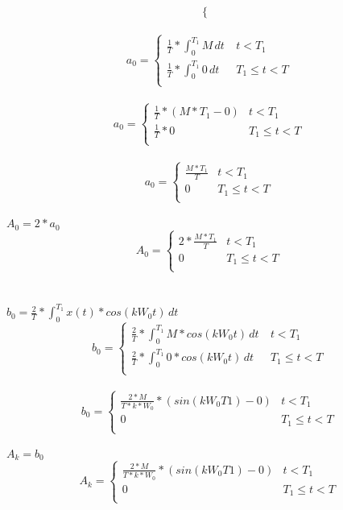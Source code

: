 \documentclass[10pt,a4paper, margin=1in]{article}
\begin{document}
\begin{enumerate}
\[\begin{cases}
   \end{cases}
\]
\\
\[a_0 = \begin{cases}
	  \frac{1}{T} * \int_{0}^{T_1} M \,dt\  & t < T_1 \\ 
	  \frac{1}{T} * \int_{0}^{T_1} 0 \,dt\  & T_1\leq t < T \\

   \end{cases}
\]
\\
\[a_0 = \begin{cases}
	  \frac{1}{T} * (M*T_1 - 0 )  & t < T_1 \\ 
	  \frac{1}{T} * 0  & T_1\leq t < T \\

   \end{cases}
\]
\\
\[a_0 = \begin{cases}
	  \frac{M*T_1}{T}  & t < T_1 \\ 
         0   & T_1\leq t < T \\

   \end{cases}
\]
\\
$A_0 = 2 * a_0$
\\
\[A_0 = \begin{cases}
	  2*\frac{M*T_1}{T}  & t < T_1 \\ 
         0   & T_1\leq t < T \\

   \end{cases}
\]
\\
\\
$b_0 = \frac{2}{T} * \int_{0}^{T_1} x(t)*cos(k W_0 t) \,dt\ $
\\
\[b_0 = \begin{cases}
	   \frac{2}{T} * \int_{0}^{T_1} M*cos(k W_0 t) \,dt\  & t < T_1 \\ 
	   \frac{2}{T} * \int_{0}^{T_1} 0*cos(k W_0 t) \,dt\  & T_1\leq t < T \\

   \end{cases}
\]
\\
\[b_0 = \begin{cases}
	   \frac{2*M}{T*k*W_0} * ( sin(k W_0 T1) - 0 )  & t < T_1 \\ 
	   0  & T_1\leq t < T \\

   \end{cases}
\]
\\
$A_k = b_0$
\\
\[A_k = \begin{cases}
	   \frac{2*M}{T*k*W_0} * ( sin(k W_0 T1) - 0 )  & t < T_1 \\ 
	   0  & T_1\leq t < T \\


\end{cases}\]
\end{enumerate}
\end{document}

